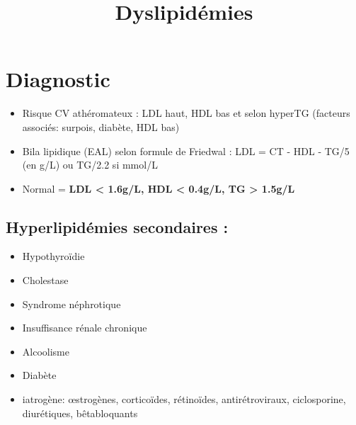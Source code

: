 \documentclass[11pt]{article}
\date{}
\title{Dyslipidémies}
\begin{document}
\maketitle
\def\dec{$\searrow{}$}
\def\inc{$\nearrow{}$}
\newcommand{\tabitem}{~~\llap{\textbullet}~~}
\newcommand{\ttabitem}{~~~~~~\llap{$\square$}~~}
\newcommand{\tttabitem}{~~~~~~~~\llap{-}~~}


\section{Diagnostic}
\label{sec:org4956287}
\begin{itemize}
\item Risque CV athéromateux : LDL haut, HDL bas et selon hyperTG (facteurs associés: surpois, diabète, HDL bas)
\item Bila lipidique (EAL) selon formule de Friedwal : LDL = CT - HDL - TG/5 (en g/L) ou TG/2.2 si mmol/L
\item Normal = \textbf{LDL < 1.6g/L, HDL < 0.4g/L, TG > 1.5g/L}
\end{itemize}

\subsection{Hyperlipidémies secondaires :}
\label{sec:org4295502}
\begin{itemize}
\item Hypothyroïdie
\item Cholestase
\item Syndrome néphrotique
\item Insuffisance rénale chronique
\item Alcoolisme
\item Diabète
\item iatrogène: \oe{}strogènes, corticoïdes, rétinoïdes, antirétroviraux, ciclosporine, diurétiques, bêtabloquants
\end{itemize}
\end{document}
